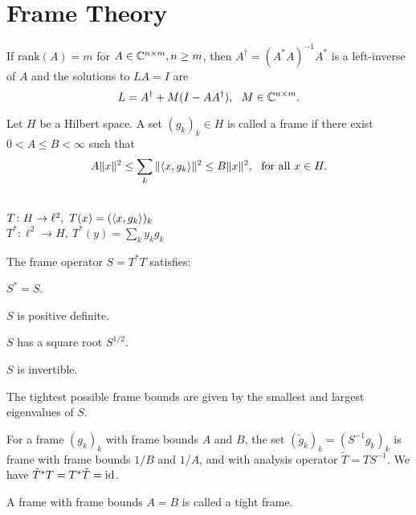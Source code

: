 \section{Frame Theory}

If $\text{rank}(A)=m$ for $A\in\mathbb{C}^{n\times m}, n\geq m$, then 
$A^\dagger = (A^*A)^{-1}A^*$ is a left-inverse of $A$ and the
solutions to $LA=I$ are 
$$L=A^\dagger+M(I-AA^\dagger), \ \ M\in \mathbb{C}^{n\times m}. $$

\begin{boxdefinition}[Frame]
	Let $H$ be a Hilbert space. A set $(g_k)_k\in H$ is called a frame
    if there exist $0<A\leq B<\infty$ such that
    $$A\|x\|^2\leq \sum_k\|\langle x,g_k\rangle\|^2\leq B\|x\|^2, 
    \ \ \text{for all } x\in H.$$
\end{boxdefinition}
\begin{boxdefinition} ~\\
    $T\colon H\to \ell^2, \ T(x)=(\langle x,g_k\rangle)_k$\\
    $T^*\colon \ell^2 \to H, \ T^*(y)=\sum_ky_kg_k$
\end{boxdefinition}

\begin{boxtheorem} 
    The frame operator $S=T^*T$ satisfies:
    \begin{listnr}
        \item $S^*=S$.
        \item $S$ is positive definite.
        \item $S$ has a square root $S^{1/2}.$
        \item $S$ is invertible.
    \end{listnr}
\end{boxtheorem}

\begin{boxtheorem}
    The tightest possible frame bounds are given by
    the smallest and largest eigenvalues of $S$.
\end{boxtheorem}

\begin{boxtheorem}
    For a frame $(g_k)_k$ with frame bounds $A$ and $B$,
    the set $(\tilde{g}_k)_k=(S^{-1}g_k)_k$ is frame with frame bounds 
    $1/B$ and $1/A$, and with analysis operator 
    $\tilde{T}=TS^{-1}$.
     We have $\tilde{T}^*T=T^*\tilde T=\operatorname*{id}$.
\end{boxtheorem}

\begin{boxdefinition}
    A frame with frame bounds $A=B$ is called a {tight frame.}
\end{boxdefinition}

